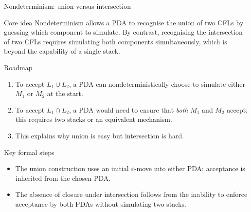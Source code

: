 \begin{frame}[t]{Nondeterminism: union versus intersection}
  \begin{tblock}{Core idea}
    Nondeterminism allows a PDA to recognise the union of two CFLs by
    guessing which component to simulate.  By contrast, recognising the
    intersection of two CFLs requires simulating both components
    simultaneously, which is beyond the capability of a single stack.
  \end{tblock}
  \begin{tblock}{Roadmap}
    \begin{enumerate}
      \item To accept $L_1 \cup L_2$, a PDA can nondeterministically
        choose to simulate either $M_1$ or $M_2$ at the start.
      \item To accept $L_1 \cap L_2$, a PDA would need to ensure that
        \emph{both} $M_1$ and $M_2$ accept; this requires two stacks or
        an equivalent mechanism.
      \item This explains why union is easy but intersection is hard.
    \end{enumerate}
  \end{tblock}
  \begin{tblock}{Key formal steps}
    \begin{itemize}
      \item The union construction uses an initial $\varepsilon$‑move
        into either PDA; acceptance is inherited from the chosen PDA.
      \item The absence of closure under intersection follows from the
        inability to enforce acceptance by both PDAs without simulating
        two stacks.
    \end{itemize}
  \end{tblock}
  \label{fr:6.2-17}
\end{frame}

